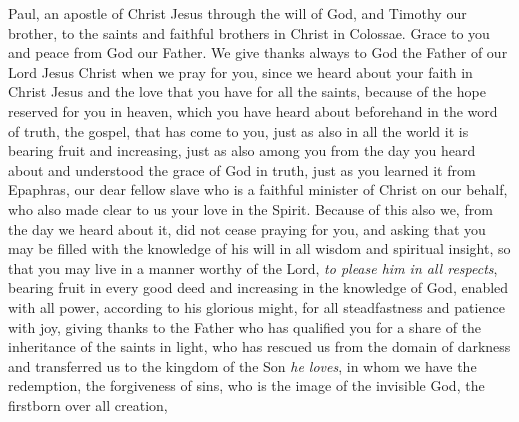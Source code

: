 
\begin{biblechapter} %
 Paul, an apostle of Christ Jesus through the will of God, and Timothy our brother,
\verse to the saints and faithful brothers in Christ in Colossae. Grace to you and peace from God our Father.
 We give thanks always to God the Father of our Lord Jesus Christ when we pray for you,
\verse since we heard about your faith in Christ Jesus and the love that you have for all the saints,
\verse because of the hope reserved for you in heaven, which you have heard about beforehand in the word of truth, the gospel,
\verse that has come to you, just as also in all the world it is bearing fruit and increasing, just as also among you from the day you heard about and understood the grace of God in truth,
\verse just as you learned it from Epaphras, our dear fellow slave who is a faithful minister of Christ on our behalf,
\verse who also made clear to us your love in the Spirit.
 Because of this also we, from the day we heard about it, did not cease praying for you, and asking that you may be filled with the knowledge of his will in all wisdom and spiritual insight,
\verse so that you may live in a manner worthy of the Lord, \textit{to please him in all respects}, bearing fruit in every good deed and increasing in the knowledge of God,
\verse enabled with all power, according to his glorious might, for all steadfastness and patience with joy,
\verse giving thanks to the Father who has qualified you for a share of the inheritance of the saints in light,
\verse who has rescued us from the domain of darkness and transferred us to the kingdom of the Son \textit{he loves},
\verse in whom we have the redemption, the forgiveness of sins,
\verse who is the image of the invisible God, the firstborn over all creation,

\end{biblechapter}
